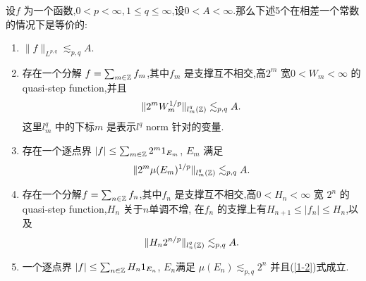 \begin{theorem}[Characterisation of $L^{p,q}$]
  设$f$ 为一个函数,$0<p<\infty,1\le q\le \infty$,设$0<A<\infty$.那么下述5个在相差一个常数的情况下是等价的:
  \begin{enumerate}
    \item  $\|f\|_{L^{p,q}}\lesssim_{p,q}A$.
    \item  存在一个分解 $f=\sum_{m\in \mathbb{Z}}^{} f_m$,其中$f_m$ 是支撑互不相交,高$2^{m}$ 宽$0<W_m<\infty$ 的 quasi-step function,并且
      \begin{equation}
	\|2^{m}W^{1 /p}_m\|_{l^{q}_m(\mathbb{Z})}\lesssim_{p,q}A.
      \end{equation}
      这里$l^{q}_m$ 中的下标$m$ 是表示$l^{q}$ norm 针对的变量.
    \item 存在一个逐点界 $|f|\le \sum_{m\in \mathbb{Z}}^{} 2^{m} 1_{E_m}$, $E_m$ 满足
      \begin{equation}
	\|2^{m}\mu(E_m)^{1 /p}\|_{l^{q}_m(\mathbb{Z})}\lesssim_{p,q}A.
      \end{equation}
    \item 存在一个分解$f=\sum_{n \in \mathbb{Z}}^{} f_{n}$,其中$f_n$ 是支撑互不相交,高$0<H_n<\infty$ 宽 $2^{n}$ 的 quasi-step function,$H_n$ 关于$n$单调不增, 在$f_n$ 的支撑上有$H_{n+1}\le |f_n|\le H_n$,以及
      \begin{equation}\label{1-2}
	\|H_n 2^{n /p}\|_{l^{q}_n(\mathbb{Z})}\lesssim_{p,q}A.
      \end{equation}
  \item 一个逐点界 $|f|\le \sum_{n\in \mathbb{Z}}^{} H_n 1_{E_n}$, $E_n$满足 $\mu(E_n)\lesssim_{p,q}2^{n}$ 并且{\normalfont (\ref{1-2})}式成立.
  \end{enumerate}
\end{theorem}
